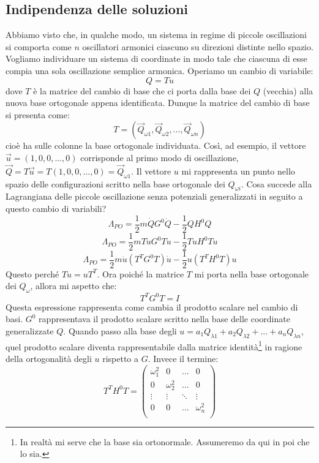 \documentclass[a4paper,openany]{article}
\begin{document}
	\subsection{Indipendenza delle soluzioni}
	Abbiamo visto che, in qualche modo, un sistema in regime di piccole oscillazioni si comporta come $n$ oscillatori armonici ciascuno su direzioni distinte nello spazio. Vogliamo individuare un sistema di coordinate in modo tale che ciascuna di esse compia una sola oscillazione semplice armonica.
	Operiamo un cambio di variabile:
	\begin{equation}\label{key}
		Q = Tu
	\end{equation} 
	dove $T$ è la matrice del cambio di base che ci porta dalla base dei $Q$ (vecchia) alla nuova base ortogonale appena identificata. Dunque la matrice del cambio di base si presenta come:
	$$
	T = (\vec{Q}_{\omega1},\vec{Q}_{\omega2}, ..., \vec{Q}_{\omega n})
	$$
	cioè ha sulle colonne la base ortogonale individuata. Così, ad esempio, il vettore $\vec{u} = (1,0,0,...,0)$ corrisponde al primo modo di oscillazione, $\vec{Q} = T\vec{u} = T(1,0,0, ...,0) = \vec{Q}_{\omega1}$. Il vettore $u$ mi rappresenta un punto nello spazio delle configurazioni scritto nella base ortogonale dei $Q_{\omega i}$. Cosa succede alla Lagrangiana delle piccole oscillazione senza potenziali generalizzati in seguito a questo cambio di variabili?
	\begin{equation}\label{key}
		\Lambda_{PO} = \dfrac{1}{2}m\dot{Q}G^{0}\dot{Q} - \dfrac{1}{2}Q H^{0} Q
	\end{equation}
	$$
	\Lambda_{PO} = \dfrac{1}{2}mT\dot{u}G^{0}T\dot{u} - \dfrac{1}{2}Tu H^{0} Tu
	$$
	$$
	\Lambda_{PO} = \dfrac{1}{2}m\dot{u}(T^{T}G^{0}T)\dot{u} - \dfrac{1}{2}u(T^{T}H^{0}T)u
	$$
	Questo perché $Tu = uT^{T}$. Ora poiché la matrice $T$ mi porta nella base ortogonale dei $Q_{\omega}$, allora mi aspetto che:
	$$
	T^{T}G^{0} T = I
	$$
	Questa espressione rappresenta come cambia il prodotto scalare nel cambio di basi. $G^{0}$ rappresentava il prodotto scalare scritto nella base delle coordinate generalizzate $Q$. Quando passo alla base degli $u = a_{1}Q_{\lambda 1} + a_{2}Q_{\lambda 2} + ... + a_{n}Q_{\lambda n}$, quel prodotto scalare diventa rappresentabile dalla matrice identità\footnote{In realtà mi serve che la base sia ortonormale. Assumeremo da qui in poi che lo sia.} in ragione della ortogonalità degli $u$ rispetto a $G$.
	Invece il termine:
	\begin{equation}\label{key}
		T^{T}H^{0}T = \begin{pmatrix}
			\omega_{1}^{2} & 0 & \dots & 0 \\
			0 & \omega_{2}^{2} & \dots & 0 \\
			\vdots & \vdots & \ddots & \vdots \\
			0 & 0 & \dots & \omega_{n}^{2}\\
		\end{pmatrix}
	\end{equation}
\end{document}
